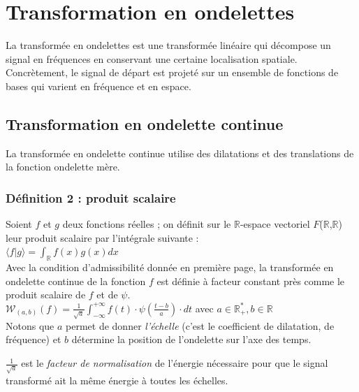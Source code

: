 \documentclass{article}
\begin{document}
\pagebreak

\section{Transformation en ondelettes}

La transformée en ondelettes est une transformée linéaire qui décompose un signal en fréquences en conservant une certaine localisation spatiale. Concrètement, le signal de départ est projeté sur un ensemble de fonctions de bases qui varient en fréquence et en espace. 

\subsection{Transformation en ondelette continue}

La transformée en ondelette continue utilise des dilatations et des translations de la fonction ondelette mère. 

\subsubsection{Définition 2 : produit scalaire}

Soient $f$ et $g$ deux fonctions réelles ; on définit sur le $\mathbb{R}$-espace vectoriel $F$($\mathbb{R}$,$\mathbb{R}$) leur produit scalaire par l’intégrale suivante : \\

$\displaystyle \langle f|g \rangle = \int_{\mathbb{R}} f(x)g(x)dx$ \\

Avec la condition d’admissibilité donnée en première page, la transformée en ondelette continue de la fonction $f$ est définie à facteur constant près comme le produit scalaire de $f$ et de $\psi$. \\

$\displaystyle \mathcal{W}_{(a,b)}(f)= \frac{1}{\sqrt{a}}\int_{-\infty}^{+\infty}f(t)\cdot\psi(\frac{t - b}{a})\cdot dt $ avec $a \in \mathbb{R}_{+}^{*}, b \in \mathbb{R}$ \\

Notons que $a$ permet de donner \textit{l’échelle} (c’est le coefficient de dilatation, de fréquence) et $b$ détermine la position de l’ondelette sur l’axe des temps.

$\frac{1}{\sqrt{a}}$ est le \textit{facteur de normalisation} de l'énergie nécessaire pour que le signal transformé ait la même énergie à toutes les échelles. \\
\end{document}
